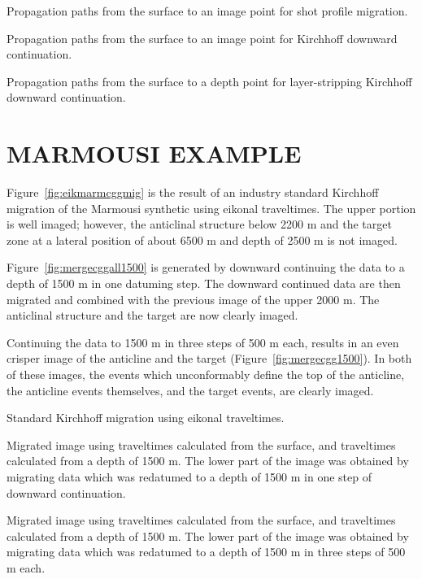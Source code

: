 {Propagation paths from the surface to an image point for shot 
profile migration.}

{Propagation paths from the surface to an image point for Kirchhoff downward
continuation.}

{Propagation paths from the surface to a depth point for layer-stripping
Kirchhoff downward continuation.}

\section{MARMOUSI EXAMPLE}

Figure~\ref{fig:eikmarmcggmig} is the result of
an industry standard Kirchhoff migration
of the Marmousi synthetic using eikonal traveltimes. The upper
portion is well imaged; however, the anticlinal structure below 2200 m and
the target zone at a lateral position of about 6500 m 
and depth of 2500 m is not imaged.

Figure~\ref{fig:mergecggall1500} is generated by downward continuing the data
to a depth of 1500 m in one datuming step. The downward
continued data are then migrated and combined with the previous image of
the upper 2000 m. The anticlinal structure and the target are now clearly
imaged.

Continuing the data to 1500 m in three steps of 500 m each, results
in an even crisper
image of the anticline and the target (Figure~\ref{fig:mergecgg1500}).
In both of these images,
the events which unconformably define the top of the anticline,
the anticline events themselves, and the target events, are clearly
imaged.

{Standard Kirchhoff migration using eikonal traveltimes.}

{Migrated image using traveltimes calculated from the surface, and
traveltimes calculated from a depth of 1500 m.
The lower part of the image was obtained by migrating data which
was redatumed to a depth of 1500 m in one step
of downward continuation.}

{Migrated image using traveltimes calculated from the surface, and 
traveltimes calculated from a depth of 1500 m.
The lower part of the image was obtained by migrating data which
was redatumed to a depth of 1500 m in three steps of 500 m each.}

